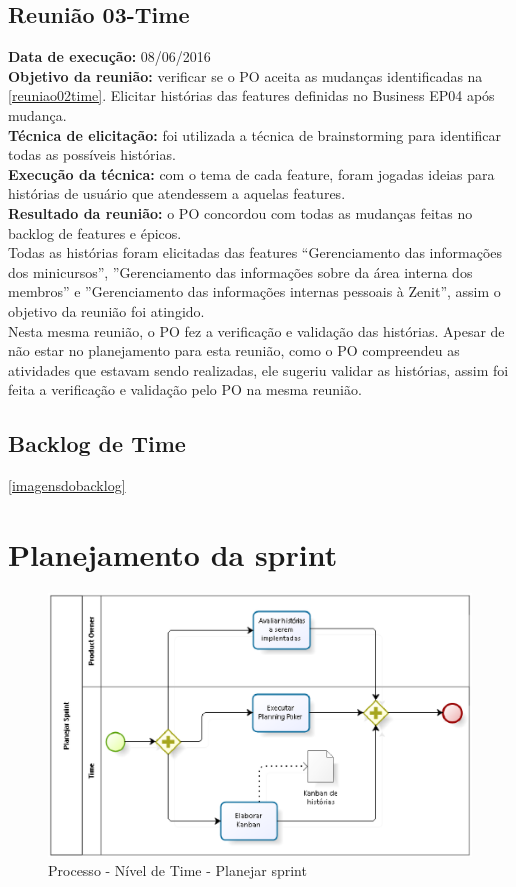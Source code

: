\subsection{Reunião 03-Time}

 \indent \textbf{Data de execução:} 08/06/2016\\
 \indent \textbf{Objetivo da reunião:} verificar se o PO aceita as mudanças identificadas na \ref{reuniao02time}. Elicitar histórias das features definidas no Business EP04 após mudança. \\
 \indent \textbf{Técnica de elicitação:} foi utilizada a técnica de brainstorming para identificar todas as possíveis histórias.\\
 \indent \textbf{Execução da técnica:} com o tema de cada feature, foram jogadas ideias para histórias de usuário que atendessem a aquelas features.\\
 \indent \textbf{Resultado da reunião:} o PO concordou com todas as mudanças feitas no backlog de features e épicos.\\
 \indent Todas as histórias foram elicitadas das features “Gerenciamento das informações dos minicursos”, ”Gerenciamento das informações sobre da área interna dos membros” e ”Gerenciamento das informações internas pessoais à Zenit”, assim o objetivo da reunião foi atingido.\\
 \indent Nesta mesma reunião, o PO fez a verificação e validação das histórias. Apesar de não estar no planejamento para esta reunião, como o PO compreendeu as atividades que estavam sendo realizadas, ele sugeriu validar as histórias, assim foi feita a verificação e validação pelo PO na mesma reunião.

\subsection{Backlog de Time}
 \ref{imagensdobacklog}

\section{Planejamento da sprint}
\begin{figure}[H]
    \centering
    \label{identificarPlanejar}
    \includegraphics[keepaspectratio=true,scale=0.6]{figuras/processoPlanejar.eps}
    \caption[Planejar sprint]{Processo - Nível de Time - Planejar sprint}
\end{figure}

